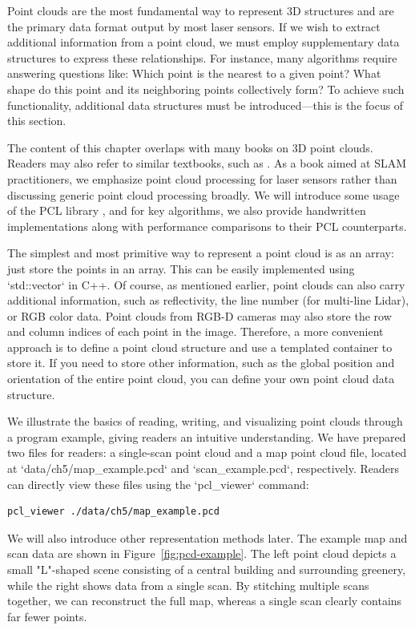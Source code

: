 Point clouds are the most fundamental way to represent 3D structures and are the primary data format output by most laser sensors. If we wish to extract additional information from a point cloud, we must employ supplementary data structures to express these relationships. For instance, many algorithms require answering questions like: Which point is the nearest to a given point? What shape do this point and its neighboring points collectively form? To achieve such functionality, additional data structures must be introduced—this is the focus of this section.  

The content of this chapter overlaps with many books on 3D point clouds. Readers may also refer to similar textbooks, such as \cite{Magnusson2009}. As a book aimed at SLAM practitioners, we emphasize point cloud processing for laser sensors rather than discussing generic point cloud processing broadly. We will introduce some usage of the PCL library \cite{Rusu2011}, and for key algorithms, we also provide handwritten implementations along with performance comparisons to their PCL counterparts.  

The simplest and most primitive way to represent a point cloud is as an array: just store the points in an array. This can be easily implemented using `std::vector` in C++. Of course, as mentioned earlier, point clouds can also carry additional information, such as reflectivity, the line number (for multi-line Lidar), or RGB color data. Point clouds from RGB-D cameras may also store the row and column indices of each point in the image. Therefore, a more convenient approach is to define a point cloud structure and use a templated container to store it. If you need to store other information, such as the global position and orientation of the entire point cloud, you can define your own point cloud data structure.  

We illustrate the basics of reading, writing, and visualizing point clouds through a program example, giving readers an intuitive understanding. We have prepared two files for readers: a single-scan point cloud and a map point cloud file, located at `data/ch5/map_example.pcd` and `scan_example.pcd`, respectively. Readers can directly view these files using the `pcl_viewer` command:  
\begin{lstlisting}[language=sh,caption=Terminal input:]  
pcl_viewer ./data/ch5/map_example.pcd  
\end{lstlisting}  

We will also introduce other representation methods later. The example map and scan data are shown in Figure~\ref{fig:pcd-example}. The left point cloud depicts a small "L"-shaped scene consisting of a central building and surrounding greenery, while the right shows data from a single scan. By stitching multiple scans together, we can reconstruct the full map, whereas a single scan clearly contains far fewer points.  

